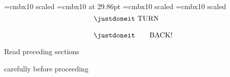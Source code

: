 \font\justdoit=cmbx10 scaled 
\font\justdoneit=cmbx10 at 29.86pt
\font\cookbook=cmbx10 scaled 
\font\authors=cmbx10 scaled 
\vglue 2.5in
$$\vbox{\hbox{\justdoneit TURN}
\bigskip
\hbox{\justdoneit\qquad BACK!}}$$
\vskip 2in
\centerline{\cookbook Read preceding sections}
\smallskip
\centerline{\cookbook carefully before proceeding}



